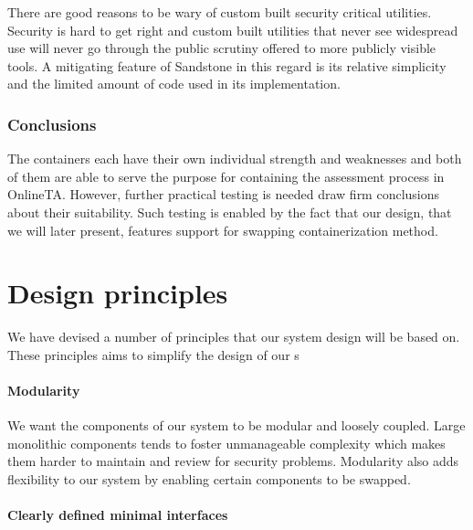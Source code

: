 There are good reasons to be wary of custom built security
critical utilities. Security is hard to get right and custom built
utilities that never see widespread use will never go through the
public scrutiny offered to more publicly visible tools. A mitigating
feature of Sandstone in this regard is its relative simplicity and the
limited amount of code used in its implementation.

\subsubsection{Conclusions}
The containers each have their own individual strength and weaknesses
and both of them are able to serve the purpose for containing the
assessment process in OnlineTA. However, further practical testing is
needed draw firm conclusions about their suitability. Such testing is
enabled by the fact that our design, that we will later present,
features support for swapping containerization method.


\section{Design principles}
We have devised a number of principles that our system design will be
based on. These principles aims to simplify the design of our s

\paragraph{Modularity}
We want the components of our system to be modular and loosely
coupled. Large monolithic components tends to foster unmanageable
complexity which makes them harder to maintain and review for security
problems.
Modularity also adds flexibility to our system by enabling certain
components to be swapped.

\paragraph{Clearly defined minimal interfaces}


